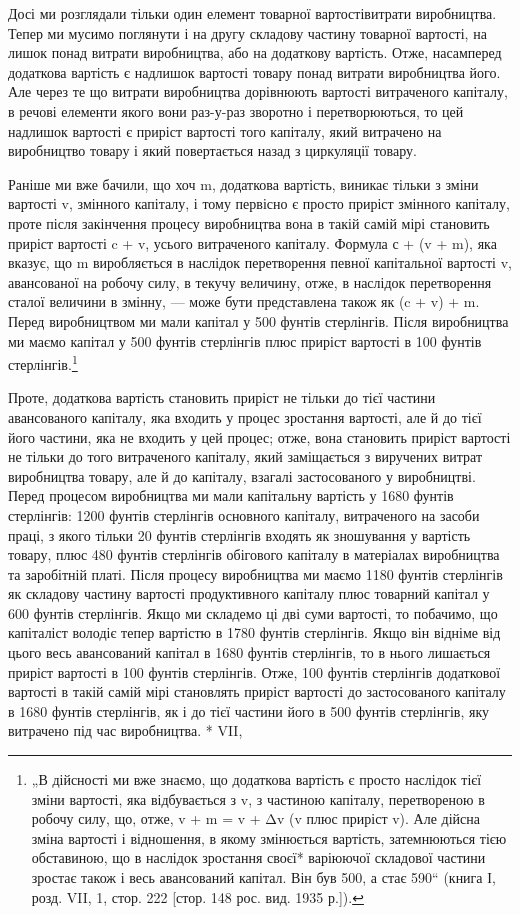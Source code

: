 Досі ми розглядали тільки один елемент товарної вартостівитрати
виробництва. Тепер ми мусимо поглянути і на другу
складову частину товарної вартості, на лишок понад витрати
виробництва, або на додаткову вартість. Отже, насамперед додаткова
вартість є надлишок вартості товару понад витрати виробництва
його. Але через те що витрати виробництва дорівнюють
вартості витраченого капіталу, в речові елементи якого вони
раз-у-раз зворотно і перетворюються, то цей надлишок вартості
є приріст вартості того капіталу, який витрачено на виробництво
товару і який повертається назад з циркуляції товару.

Раніше ми вже бачили, що хоч m, додаткова вартість, виникає
тільки з зміни вартості v, змінного капіталу, і тому первісно
є просто приріст змінного капіталу, проте після закінчення
процесу виробництва вона в такій самій мірі становить
приріст вартості c + v, усього витраченого капіталу. Формула
с + (v + m), яка вказує, що m виробляється в наслідок перетворення
певної капітальної вартості v, авансованої на робочу силу,
в текучу величину, отже, в наслідок перетворення сталої величини
в змінну, — може бути представлена також як (c + v) + m.
Перед виробництвом ми мали капітал у 500 фунтів стерлінгів.
Після виробництва ми маємо капітал у 500 фунтів стерлінгів
плюс приріст вартості в 100 фунтів стерлінгів.\footnote{
„В дійсності ми вже знаємо, що додаткова вартість є просто наслідок
тієї зміни вартості, яка відбувається з v, з частиною капіталу, перетвореною
в робочу силу, що, отже, v + m = v + Δv (v плюс приріст v). Але дійсна зміна
вартості і відношення, в якому змінюється вартість, затемнюються тією обставиною,
що в наслідок зростання своєї* варіюючої складової частини зростає
також і весь авансований капітал. Він був 500, а стає 590“ (книга І, розд.
VII, 1, стор. 222 [стор. 148 рос. вид. 1935 р.]).
}

Проте, додаткова вартість становить приріст не тільки до
тієї частини авансованого капіталу, яка входить у процес зростання
вартості, але й до тієї його частини, яка не входить у цей
процес; отже, вона становить приріст вартості не тільки до того
витраченого капіталу, який заміщається з виручених витрат виробництва
товару, але й до капіталу, взагалі застосованого у виробництві.
Перед процесом виробництва ми мали капітальну
вартість у 1680 фунтів стерлінгів: 1200 фунтів стерлінгів основного
капіталу, витраченого на засоби праці, з якого тільки
20 фунтів стерлінгів входять як зношування у вартість товару,
плюс 480 фунтів стерлінгів обігового капіталу в матеріалах виробництва
та заробітній платі. Після процесу виробництва ми
маємо 1180 фунтів стерлінгів як складову частину вартості
продуктивного капіталу плюс товарний капітал у 600 фунтів
стерлінгів. Якщо ми складемо ці дві суми вартості, то побачимо,
що капіталіст володіє тепер вартістю в 1780 фунтів стерлінгів.
Якщо він відніме від цього весь авансований капітал в 1680
фунтів стерлінгів, то в нього лишається приріст вартості в 100
фунтів стерлінгів. Отже, 100 фунтів стерлінгів додаткової вартості
в такій самій мірі становлять приріст вартості до застосованого
капіталу в 1680 фунтів стерлінгів, як і до тієї частини
його в 500 фунтів стерлінгів, яку витрачено під час виробництва.
* VII,
